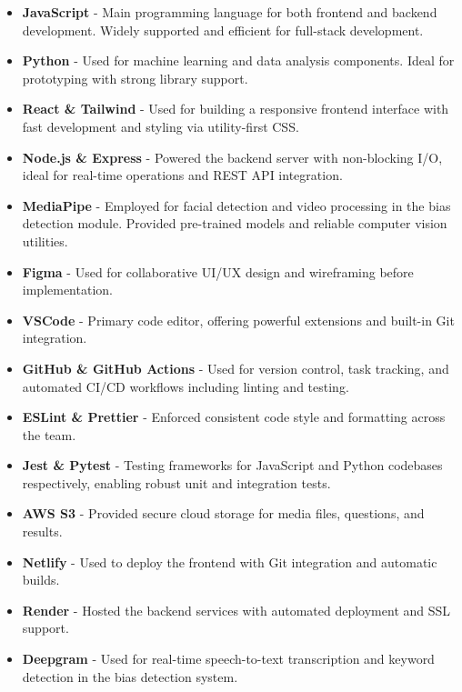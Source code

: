\documentclass{article}
\begin{document}
\begin{itemize}
    \item \textbf{JavaScript} - Main programming language for both frontend and backend development. 
    Widely supported and efficient for full-stack development.
    
    \item \textbf{Python} - Used for machine learning and data analysis components. 
    Ideal for prototyping with strong library support.
    
    \item \textbf{React \& Tailwind} - Used for building a responsive frontend interface with fast development 
    and styling via utility-first CSS.
    
    \item \textbf{Node.js \& Express} - Powered the backend server with non-blocking I/O, 
    ideal for real-time operations and REST API integration.
    
    \item \textbf{MediaPipe} - Employed for facial detection and video processing in the bias detection module. 
    Provided pre-trained models and reliable computer vision utilities.
    
    \item \textbf{Figma} - Used for collaborative UI/UX design and wireframing before implementation.
    
    \item \textbf{VSCode} - Primary code editor, offering powerful extensions and built-in Git integration.
    
    \item \textbf{GitHub \& GitHub Actions} - Used for version control, task tracking, and automated CI/CD workflows 
    including linting and testing.
    
    \item \textbf{ESLint \& Prettier} - Enforced consistent code style and formatting across the team.
    
    \item \textbf{Jest \& Pytest} - Testing frameworks for JavaScript and Python codebases respectively, 
    enabling robust unit and integration tests.
    
    \item \textbf{AWS S3} - Provided secure cloud storage for media files, questions, and results.
    
    \item \textbf{Netlify} - Used to deploy the frontend with Git integration and automatic builds.
    
    \item \textbf{Render} - Hosted the backend services with automated deployment and SSL support.
    
    \item \textbf{Deepgram} - Used for real-time speech-to-text transcription and keyword detection in the 
    bias detection system.
\end{itemize}
\end{document}
